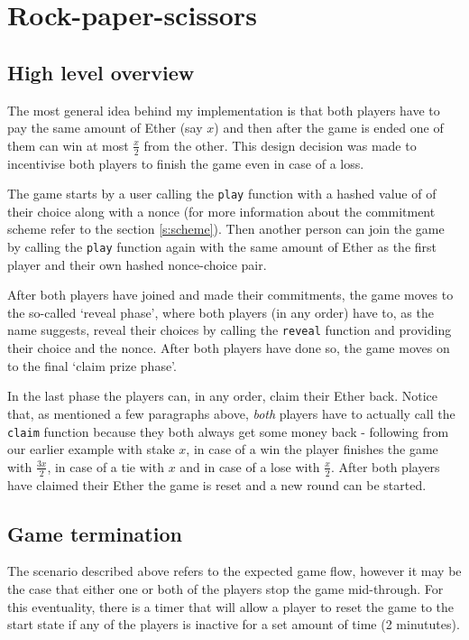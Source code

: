 \documentclass{article}
\begin{document}
    \section{Rock-paper-scissors}

    \subsection{High level overview} \label{s:overview}
    The most general idea behind my implementation is that
    both players have to pay the same amount of Ether (say
    \(x\)) and then after the game is ended one of them can
    win at most \(\frac{x}{2}\) from the other. This design
    decision was made to incentivise both players to finish
    the game even in case of a loss.
    \newline

    \noindent The game starts by a user calling the
    \verb|play| function with a hashed value of of their
    choice along with a nonce (for more information about
    the commitment scheme refer to the section
    \ref{s:scheme}). Then another person can join the game
    by calling the \verb|play| function again with the same
    amount of Ether as the first player and their own hashed
    nonce-choice pair.
    \newline

    \noindent After both players have joined and made their
    commitments, the game moves to the so-called `reveal
    phase', where both players (in any order) have to, as
    the name suggests, reveal their choices by calling the
    \verb|reveal| function and providing their choice and
    the nonce. After both players have done so, the game
    moves on to the final `claim prize phase'.
    \newline

    \noindent In the last phase the players can, in any
    order, claim their Ether back. Notice that, as mentioned
    a few paragraphs above, {\itshape both} players have to
    actually call the \verb|claim| function because they
    both always get some money back - following from our
    earlier example with stake \(x\), in case of a win the
    player finishes the game with \(\frac{3x}{2}\), in case
    of a tie with \(x\) and in case of a lose with
    \(\frac{x}{2}\). After both players have claimed their
    Ether the game is reset and a new round can be started.

    \subsection{Game termination}
    The scenario described above refers to the expected game
    flow, however it may be the case that either one or both
    of the players stop the game mid-through. For this
    eventuality, there is a timer that will allow a player
    to reset the game to the start state if any of the
    players is inactive for a set amount of time (2
    minututes).
    \newline
\end{document}
